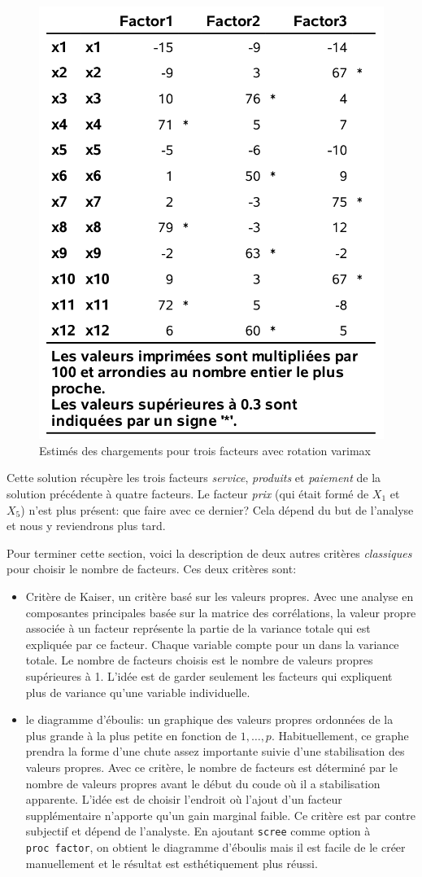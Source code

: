 \documentclass[
  11pt,
  letterpaper,
]{book}
\providecommand{\tightlist}{%
  \setlength{\itemsep}{0pt}\setlength{\parskip}{0pt}}
\theoremstyle{definition}
\theoremstyle{definition}
\theoremstyle{definition}
\theoremstyle{remark}
\begin{document}
\begin{figure}

{\centering \includegraphics[width=0.55\linewidth]{figures/01-facto-e5} 

}

\caption{Estimés des chargements pour trois facteurs avec rotation varimax}\label{fig:fig1p5}
\end{figure}

Cette solution récupère les trois facteurs \emph{service}, \emph{produits} et \emph{paiement} de la solution précédente à quatre facteurs. Le facteur \emph{prix} (qui était formé de \(X_1\) et \(X_5\)) n'est plus présent: que faire avec ce dernier? Cela dépend du but de l'analyse et nous y reviendrons plus tard.

Pour terminer cette section, voici la description de deux autres
critères \emph{classiques} pour choisir le nombre de facteurs. Ces deux critères sont:

\begin{itemize}
\tightlist
\item
  Critère de Kaiser, un critère basé sur les valeurs propres. Avec une analyse en composantes principales basée sur la matrice des corrélations, la valeur propre associée à un facteur représente la partie de la variance totale qui est expliquée par ce facteur. Chaque variable compte pour un dans la variance totale. Le nombre de facteurs choisis est le nombre de valeurs propres supérieures à 1. L'idée est de garder seulement les facteurs qui expliquent plus de variance qu'une variable individuelle.
\item
  le diagramme d'éboulis: un graphique des valeurs propres ordonnées de la plus grande à la plus petite en fonction de \(1, \ldots, p\). Habituellement, ce graphe prendra la forme d'une chute assez importante suivie d'une stabilisation des valeurs propres. Avec ce critère, le nombre de facteurs est déterminé par le nombre de valeurs propres avant le début du coude où il a stabilisation apparente. L'idée est de choisir l'endroit où l'ajout d'un facteur supplémentaire n'apporte qu'un gain marginal faible. Ce critère est par contre subjectif et dépend de l'analyste. En ajoutant \texttt{scree} comme option à \texttt{proc\ factor}, on obtient le diagramme d'éboulis mais il est facile de le créer manuellement et le résultat est esthétiquement plus réussi.
\end{itemize}
\end{document}

